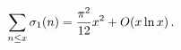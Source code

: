 \[\sum_{n\leq x}\mathop{\sigma_{1}\/}\nolimits\!\left(n\right)=\frac{\pi^{2}}{12%
}x^{2}+\mathop{O\/}\nolimits\!\left(x\mathop{\ln\/}\nolimits x\right).\]
